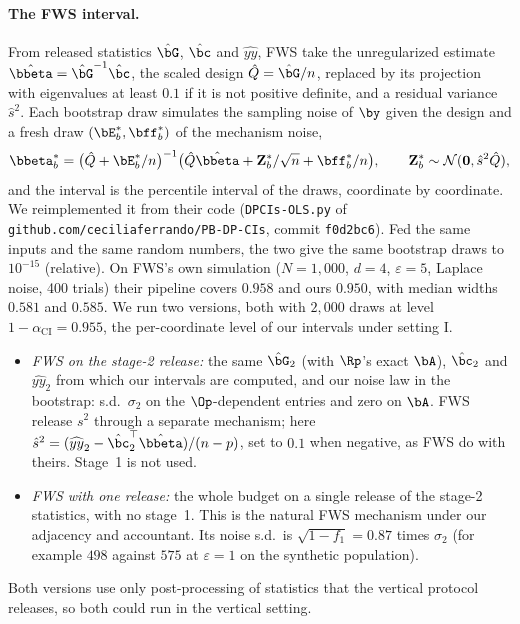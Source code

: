 \paragraph{The FWS interval.} From released statistics $\hat\bG$, $\hat\bc$ and $\widehat{yy}$, FWS take the unregularized estimate $\hat\bbeta = \hat\bG^{-1}\hat\bc$, the scaled design $\hat Q = \hat\bG/n$, replaced by its projection with eigenvalues at least $0.1$ if it is not positive definite, and a residual variance $\hat s^2$. Each bootstrap draw simulates the sampling noise of $\by$ given the design and a fresh draw $(\bE^\ast_b, \bff^\ast_b)$ of the mechanism noise,
\[
  \bbeta^\ast_b = \bigl(\hat Q + \bE^\ast_b/n\bigr)^{-1}\bigl(\hat Q\hat\bbeta + \mathbf Z^\ast_b/\sqrt n + \bff^\ast_b/n\bigr), \qquad \mathbf Z^\ast_b \sim \mathcal N(\mathbf 0, \hat s^2\hat Q),
\]
and the interval is the percentile interval of the draws, coordinate by coordinate. We reimplemented it from their code (\texttt{DPCIs-OLS.py} of \texttt{github.com/ceciliaferrando/PB-DP-CIs}, commit \texttt{f0d2bc6}). Fed the same inputs and the same random numbers, the two give the same bootstrap draws to $10^{-15}$ (relative). On FWS's own simulation ($N = 1{,}000$, $d = 4$, $\varepsilon = 5$, Laplace noise, 400 trials) their pipeline covers $0.958$ and ours $0.950$, with median widths $0.581$ and $0.585$. We run two versions, both with $2{,}000$ draws at level $1 - \alpha_{\mathrm{CI}} = 0.955$, the per-coordinate level of our intervals under setting I.
\begin{itemize}[noitemsep]
  \item \emph{FWS on the stage-2 release:} the same $\hat\bG_2$ (with $\Rp$'s exact $\bA$), $\hat\bc_2$ and $\widehat{yy}_2$ from which our intervals are computed, and our noise law in the bootstrap: s.d.\ $\sigma_2$ on the $\Op$-dependent entries and zero on $\bA$. FWS release $s^2$ through a separate mechanism; here $\hat s^2 = (\widehat{yy}_2 - \hat\bc_2^\top\hat\bbeta)/(n - p)$, set to $0.1$ when negative, as FWS do with theirs. Stage~1 is not used.
  \item \emph{FWS with one release:} the whole budget on a single release of the stage-2 statistics, with no stage~1. This is the natural FWS mechanism under our adjacency and accountant. Its noise s.d.\ is $\sqrt{1 - f_1} = 0.87$ times $\sigma_2$ (for example $498$ against $575$ at $\varepsilon = 1$ on the synthetic population).
\end{itemize}
Both versions use only post-processing of statistics that the vertical protocol releases, so both could run in the vertical setting.

